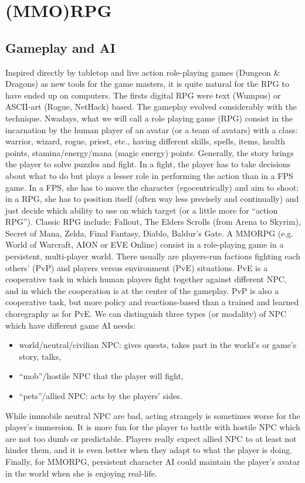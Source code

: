 
\section{(MMO)RPG}

\subsection{Gameplay and AI}
Inspired directly by tabletop and live action role-playing games (Dungeon \& Dragons) as new tools for the game masters, it is quite natural for the RPG to have ended up on computers. The firsts digital RPG were text (Wumpus) or ASCII-art (Rogue, NetHack) based. The gameplay evolved considerably with the technique. Nwadays, what we will call a role playing game (RPG) consist in the incarnation by the human player of an avatar (or a team of avatars) with a class: warrior, wizard, rogue, priest, etc., having different skills, spells, items, health points, stamina/energy/mana (magic energy) points. Generally, the story brings the player to solve puzzles and fight. In a fight, the player has to take decisions about what to do but plays a lesser role in performing the action than in a FPS game. In a FPS, she has to move the character (egocentrically) and aim to shoot; in a RPG, she has to position itself (often way less precisely and continually) and just decide which ability to use on which target (or a little more for ``action RPG''). Classic RPG include: Fallout, The Elders Scrolls (from Arena to Skyrim), Secret of Mana, Zelda, Final Fantasy, Diablo, Baldur's Gate. A MMORPG (e.g. World of Warcraft, AION or EVE Online) consist in a role-playing game in a persistent, multi-player world. There usually are players-run factions fighting each others’ (PvP) and players versus environment (PvE) situations. PvE is a cooperative task in which human players fight together against different NPC, and in which the cooperation is at the center of the gameplay. PvP is also a cooperative task, but more policy and reactions-based than a trained and learned choregraphy as for PvE. We can distinguish three types (or modality) of NPC which have different game AI needs:
\begin{itemize}
    \item world/neutral/civilian NPC: gives quests, takes part in the world's or game's story, talks,
    \item ``mob''/hostile NPC that the player will fight, 
    \item ``pets''/allied NPC: acts by the players' sides.
\end{itemize}
While immobile neutral NPC are bad, acting strangely is sometimes worse for the player's immersion. It is more fun for the player to battle with hostile NPC which are not too dumb or predictable. Players really expect allied NPC to at least not hinder them, and it is even better when they adapt to what the player is doing. Finally, for MMORPG, persistent character AI could maintain the player's avatar in the world when she is enjoying real-life.

